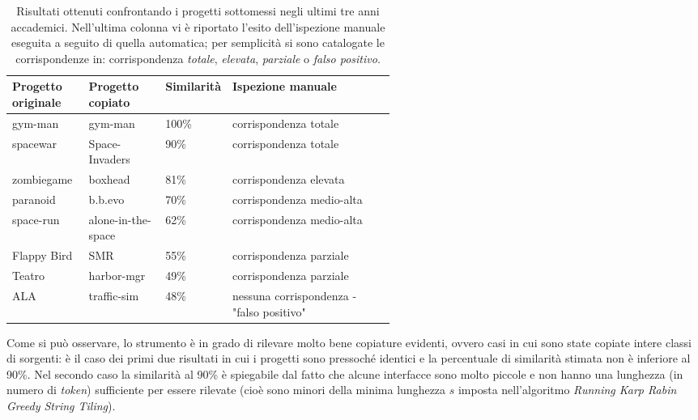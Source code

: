 \begin{table}[h!]
    \centering
    \begin{tabular}{|p{0.2\linewidth}|p{0.2\linewidth}|p{0.15\linewidth}|p{}|}
        \hline
        \textbf{Progetto originale} & \textbf{Progetto copiato} & \textbf{Similarità} & \textbf{Ispezione manuale} \\ [0.5ex] 
        \hline\hline
        gym-man & gym-man & 100\% & corrispondenza totale \\
        \hline
        spacewar & Space-Invaders & 90\% & corrispondenza totale \\
        \hline
        zombiegame & boxhead & 81\% & corrispondenza elevata \\
        \hline
        paranoid & b.b.evo & 70\% & corrispondenza medio-alta \\
        \hline
        space-run & alone-in-the-space & 62\% & corrispondenza medio-alta \\
        \hline
        Flappy Bird & SMR & 55\% & corrispondenza parziale \\
        \hline
        Teatro & harbor-mgr & 49\% & corrispondenza parziale \\
        \hline
        ALA & traffic-sim & 48\% & nessuna corrispondenza - "falso positivo" \\
        \hline
    \end{tabular}
    \caption[Risultati ottenuti confrontando i progetti sottomessi negli ultimi tre anni accademici]{Risultati ottenuti confrontando i progetti sottomessi negli ultimi tre anni accademici. Nell'ultima colonna vi è riportato l'esito dell'ispezione manuale eseguita a seguito di quella automatica; per semplicità si sono catalogate le corrispondenze in: corrispondenza \textit{totale}, \textit{elevata}, \textit{parziale} o \textit{falso positivo}.}
    \label{table:results}
\end{table}

Come si può osservare, lo strumento è in grado di rilevare molto bene copiature evidenti, ovvero casi in cui sono state copiate intere classi di sorgenti: è il caso dei primi due risultati in cui i progetti sono pressoché identici e la percentuale di similarità stimata non è inferiore al 90\%.
%
Nel secondo caso la similarità al 90\% è spiegabile dal fatto che alcune interfacce sono molto piccole e non hanno una lunghezza (in numero di \textit{token}) sufficiente per essere rilevate (cioè sono minori della minima lunghezza $s$ imposta nell'algoritmo \textit{Running Karp Rabin Greedy String Tiling}).

